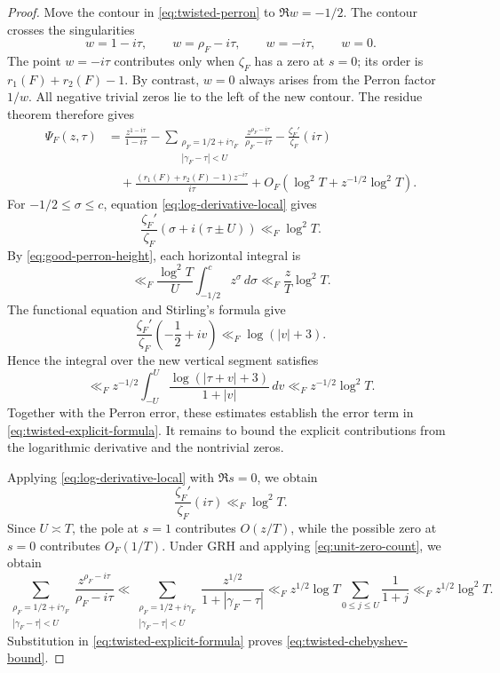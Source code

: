 \documentclass[twoside,reqno,11pt,a4paper]{amsart}
\numberwithin{equation}{section}
\theoremstyle{plain}
\theoremstyle{definition}
\theoremstyle{remark}
\renewcommand{\le}{\leqslant}
\begin{document}
\begin{proof}
Move the contour in \eqref{eq:twisted-perron} to $\Re w=-1/2$.  The contour crosses the singularities
\begin{equation*}
w=1-i\tau,\qquad w=\rho_F-i\tau,\qquad w=-i\tau,\qquad w=0.
\end{equation*}
The point $w=-i\tau$ contributes only when $\zeta_F$ has a zero at
$s=0$; its order is $r_1(F)+r_2(F)-1$.  By contrast, $w=0$ always
arises from the Perron factor $1/w$.  All negative trivial zeros lie to
the left of the new contour.  The residue theorem therefore gives
\begin{align}
\Psi_F(z,\tau)
&=\frac{z^{1-i\tau}}{1-i\tau}
-\sum_{\substack{\rho_F=1/2+i\gamma_F\\
|\gamma_F-\tau|<U}}
\frac{z^{\rho_F-i\tau}}{\rho_F-i\tau}
-\frac{\zeta_F'}{\zeta_F}(i\tau) \nonumber\\
&\quad+
\frac{(r_1(F)+r_2(F)-1)z^{-i\tau}}{i\tau}
+O_F\left(\log^2T
+z^{-1/2}\log^2T\right).
\label{eq:twisted-explicit-formula}
\end{align}
For $-1/2\le\sigma\le c$, equation \eqref{eq:log-derivative-local} gives
\begin{equation}\label{eq:good-perron-height}
\frac{\zeta_F'}{\zeta_F}(\sigma+i(\tau\pm U))
\ll_F\log^2T.
\end{equation}
By \eqref{eq:good-perron-height}, each horizontal integral is
\begin{equation*}
\ll_F\frac{\log^2T}{U}\int_{-1/2}^{c}z^\sigma\,d\sigma
\ll_F\frac zT\log^2T.
\end{equation*} 
The functional equation and
Stirling's formula give
\begin{equation*}
\frac{\zeta_F'}{\zeta_F}\left(-\frac12+iv\right)
\ll_F\log(|v|+3).
\end{equation*}
Hence the integral over the new vertical segment satisfies
\begin{equation*}
\ll_Fz^{-1/2}\int_{-U}^{U}
\frac{\log(|\tau+v|+3)}{1+|v|}\,dv
\ll_Fz^{-1/2}\log^2T.
\end{equation*}
Together with the Perron error, these estimates establish the error term in \eqref{eq:twisted-explicit-formula}. It remains to bound the explicit contributions from the logarithmic derivative and the nontrivial zeros.

Applying  \eqref{eq:log-derivative-local} with $\Re s=0$, we obtain
\begin{equation*}
\frac{\zeta_F'}{\zeta_F}(i\tau)\ll_F\log^2T.
\end{equation*}
Since $U\asymp T$, the pole at $s=1$ contributes $O(z/T)$, while the possible zero at $s=0$ contributes $O_F(1/T)$.  Under GRH and applying
\eqref{eq:unit-zero-count}, we obtain
\begin{equation*}
\sum_{\substack{\rho_F=1/2+i\gamma_F\\
|\gamma_F-\tau|<U}} \frac{z^{\rho_F-i\tau}}{\rho_F-i\tau}\ll 
\sum_{\substack{\rho_F=1/2+i\gamma_F\\
|\gamma_F-\tau|<U}}\frac{z^{1/2}}{1+|\gamma_F-\tau|}
\ll_Fz^{1/2}\log T\sum_{0\le j\le U}\frac1{1+j}
\ll_Fz^{1/2}\log^2T.
\end{equation*}
Substitution in \eqref{eq:twisted-explicit-formula} proves
\eqref{eq:twisted-chebyshev-bound}.
\end{proof}
\end{document}
